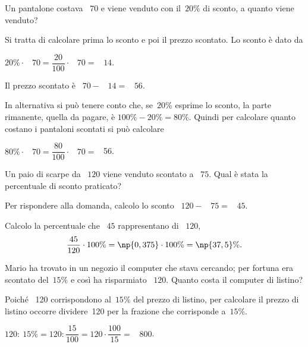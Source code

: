 \begin{exrig}
 \begin{esempio}
Un pantalone costava \officialeuro~$70$ e viene venduto con il~$20\%$ di sconto, a quanto viene venduto?

Si tratta di calcolare prima lo sconto e poi il prezzo scontato.
Lo sconto è dato da

\begin{center}
$20\%\cdot$ \officialeuro~$70=\dfrac{20}{100}\cdot$ \officialeuro~$70=$ \officialeuro~$14$.
\end{center}

Il prezzo scontato è \officialeuro~$70 -$ \officialeuro~$14=$ \officialeuro~$56$.

In alternativa si può tenere conto che, se~$20\%$ esprime lo sconto, la parte rimanente, quella da pagare, è
$100\%-20\%=80\%$. Quindi per calcolare quanto costano i pantaloni scontati si può calcolare

\begin{center}
$\displaystyle{80\%\cdot}$ \officialeuro~$70=\dfrac{80}{100}\cdot$ \officialeuro~$70=$ \officialeuro~56.
 \end{center}
 \end{esempio}

 \begin{esempio}
Un paio di scarpe da \officialeuro~$120$ viene venduto scontato a \officialeuro~$75$. Qual è stata la percentuale di
sconto praticato?

Per rispondere alla domanda, calcolo lo sconto \officialeuro~$120-$ \officialeuro~$75=$ \officialeuro~$45$.

Calcolo la percentuale che \officialeuro~$45$ rappresentano di \officialeuro~$120$,
\[\frac{45}{120}\cdot100\%=\np{0,375}\cdot100\%=\np{37,5}\%.\]
 \end{esempio}

\begin{esempio}
Mario ha trovato in un negozio il computer che stava cercando; per fortuna era scontato del~$15\%$ e così
ha risparmiato \officialeuro~$120$. Quanto costa il computer di listino?

Poiché \officialeuro~120 corrispondono al~$15\%$ del prezzo di listino, per calcolare il prezzo di listino occorre dividere~120 per la frazione che corrisponde a~$15\%$.
\begin{center}
	$120:~15\% =120:\dfrac{15}{100}=120\cdot\dfrac{100}{15}=$ \officialeuro~$800$.
\end{center}
\end{esempio}
\end{exrig}


